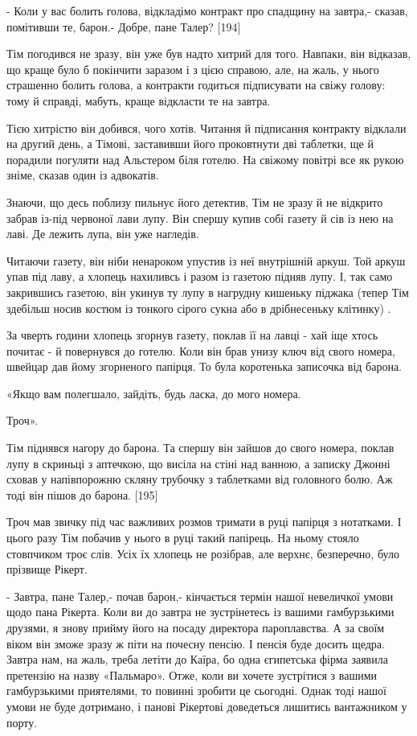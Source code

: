 - Коли у вас болить голова, відкладімо контракт про спадщину на завтра,- сказав, помітивши те, барон.- Добре, пане Талер? [194]

Тім погодився не зразу, він уже був надто хитрий для того. Навпаки, він відказав, що краще було б покінчити заразом і з цією справою, але, на жаль, у нього страшенно болить голова, а контракти годиться підписувати на свіжу голову: тому й справді, мабуть, краще відкласти те на завтра.

Тією хитрістю він добився, чого хотів. Читання й підписання контракту відклали на другий день, а Тімові, заставивши його проковтнути дві таблетки, ще й порадили погуляти над Альстером біля готелю. На свіжому повітрі все як рукою зніме, сказав один із адвокатів.

Знаючи, що десь поблизу пильнує його детектив, Тім не зразу й не відкрито забрав із-під червоної лави лупу. Він спершу купив собі газету й сів із нею на лаві. Де лежить лупа, він уже нагледів.

Читаючи газету, він ніби ненароком упустив із неї внутрішній аркуш. Той аркуш упав під лаву, а хлопець нахиливсь і разом із газетою підняв лупу. І, так само закрившись газетою, він укинув ту лупу в нагрудну кишеньку піджака (тепер Тім здебільш носив костюм із тонкого сірого сукна або в дрібнесеньку клітинку) .

За чверть години хлопець згорнув газету, поклав її на лавці - хай іще хтось почитає - й повернувся до готелю. Коли він брав унизу ключ від свого номера, швейцар дав йому згорненого папірця. То була коротенька записочка від барона.

«Якщо вам полегшало, зайдіть, будь ласка, до мого номера.

Троч».

Тім піднявся нагору до барона. Та спершу він зайшов до свого номера, поклав лупу в скриньці з аптечкою, що висіла на стіні над ванною, а записку Джонні сховав у напівпорожню скляну трубочку з таблетками від головного болю. Аж тоді він пішов до барона. [195]

Троч мав звичку під час важливих розмов тримати в руці папірця з нотатками. І цього разу Тім побачив у нього в руці такий папірець. На ньому стояло стовпчиком троє слів. Усіх їх хлопець не розібрав, але верхнє, безперечно, було прізвище Рікерт.

- Завтра, пане Талер,- почав барон,- кінчається термін нашої невеличкої умови щодо пана Рікерта. Коли ви до завтра не зустрінетесь із вашими гамбурзькими друзями, я знову прийму його на посаду директора пароплавства. А за своїм віком він зможе зразу ж піти на почесну пенсію. І пенсія буде досить щедра. Завтра нам, на жаль, треба летіти до Каїра, бо одна єгипетська фірма заявила претензію на назву «Пальмаро». Отже, коли ви хочете зустрітися з вашими гамбурзькими приятелями, то повинні зробити це сьогодні. Однак тоді нашої умови не буде дотримано, і панові Рікертові доведеться лишитись вантажником у порту.

